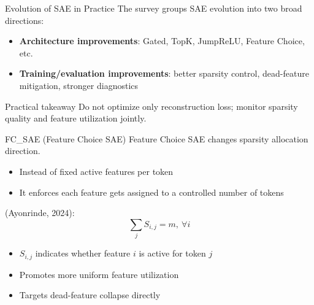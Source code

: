 \documentclass[aspectratio=169,12pt]{beamer}
\begin{document}
\begin{frame}{Evolution of SAE in Practice}
The survey groups SAE evolution into two broad directions:
\begin{itemize}
  \item \textbf{Architecture improvements}: Gated, TopK, JumpReLU, Feature Choice, etc.
  \item \textbf{Training/evaluation improvements}: better sparsity control, dead-feature mitigation, stronger diagnostics
\end{itemize}

\begin{block}{Practical takeaway}
\vspace{2pt}
Do not optimize only reconstruction loss; monitor sparsity quality and feature utilization jointly.
\end{block}
\end{frame}





\begin{frame}{FC\_SAE (Feature Choice SAE)}
Feature Choice SAE changes sparsity allocation direction.


\begin{itemize}
  \item Instead of fixed active features per token
  \item It enforces each feature gets assigned to a controlled number of tokens
\end{itemize}

(Ayonrinde, 2024):
\[
\sum_j S_{i,j} = m,\ \forall i
\]

\begin{itemize}
  \item $S_{i,j}$ indicates whether feature $i$ is active for token $j$
  \item Promotes more uniform feature utilization
  \item Targets dead-feature collapse directly
\end{itemize}
\end{frame}
\end{document}
